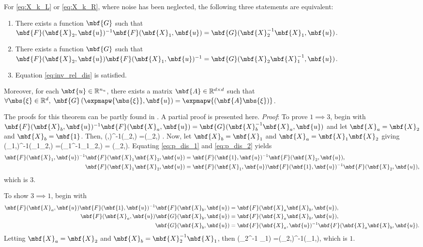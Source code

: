 \begin{theorem}
	\label{thm:inv}
	For \eqref{eq:X_k_L} or \eqref{eq:X_k_R}, where noise has been neglected, the following three statements are equivalent:
	\begin{enumerate}
		\item There exists a function $\mbf{G}$ such that $\mbf{F}(\mbf{X}_2,\mbf{u})^{-1}\mbf{F}(\mbf{X}_1,\mbf{u}) =\mbf{G}(\mbf{X}_2^{-1}\mbf{X}_1,\mbf{u})$.
		\item There exists a function $\mbf{G}$ such that $\mbf{F}(\mbf{X}_2,\mbf{u})\mbf{F}(\mbf{X}_1,\mbf{u})^{-1} =\mbf{G}(\mbf{X}_2\mbf{X}_1^{-1},\mbf{u})$.
		\item Equation \eqref{eq:inv_rel_dis} is satisfied.
	\end{enumerate}
	\sloppy Moreover, for each $\mbf{u} \in\mathbb{R}^{n_u}$, there exists a matrix $\mbf{A} \in \mathbb{R}^{d \times d}$  such that $\forall \mbs{\xi} \in \mathbb{R}^d, \;\mbf{G}\left(\expmapw{\mbs{\xi}},\mbf{u}\right) = \expmapw{\left(\mbf{A} \mbs{\xi}\right)}$.
\end{theorem}
The proofs for this theorem can be partly found in \cite{Chauchat2018,persComm2017}. A partial proof is presented here.
\textit{Proof}: To prove $1 \implies 3$, begin with  $\mbf{F}(\mbf{X}_b,\mbf{u})^{-1}\mbf{F}(\mbf{X}_a,\mbf{u}) =\mbf{G}(\mbf{X}_b^{-1}\mbf{X}_a,\mbf{u})$ and let $\mbf{X}_a = \mbf{X}_2$ and $\mbf{X}_b = \mbf{1}$. Then,
\beq
	(,)^{-1}(_2,) =(_2,) \label{eq:p_dis_1}.
\eeq
Now, let  $\mbf{X}_b = \mbf{X}_1$ and $\mbf{X}_a = \mbf{X}_1\mbf{X}_2$ giving
\beq
	(_1,)^{-1}(_1_2,) =(_1^{-1}_1_2,) = (_2,)\label{eq:p_dis_2}.
\eeq
Equating \eqref{eq:p_dis_1} and \eqref{eq:p_dis_2} yields
\begin{align}
	\mbf{F}(\mbf{X}_1,\mbf{u})^{-1}\mbf{F}(\mbf{X}_1\mbf{X}_2,\mbf{u}) & =\mbf{F}(\mbf{1},\mbf{u})^{-1}\mbf{F}(\mbf{X}_2,\mbf{u}), \notag \\
	\mbf{F}(\mbf{X}_1\mbf{X}_2,\mbf{u}) & =\mbf{F}(\mbf{X}_1,\mbf{u})\mbf{F}(\mbf{1},\mbf{u})^{-1}\mbf{F}(\mbf{X}_2,\mbf{u})\notag,
\end{align}
which is $3$.

To show $3 \implies 1$, begin with
\begin{align}
	\mbf{F}(\mbf{X}_a,\mbf{u})\mbf{F}(\mbf{1},\mbf{u})^{-1}\mbf{F}(\mbf{X}_b,\mbf{u}) & =\mbf{F}(\mbf{X}_a\mbf{X}_b,\mbf{u}), \notag \\
	\mbf{F}(\mbf{X}_a,\mbf{u})\mbf{G}(\mbf{X}_b,\mbf{u}) & =\mbf{F}(\mbf{X}_a\mbf{X}_b,\mbf{u}), \notag \\
	\mbf{G}(\mbf{X}_b,\mbf{u}) & =\mbf{F}(\mbf{X}_a,\mbf{u})^{-1}\mbf{F}(\mbf{X}_a\mbf{X}_b,\mbf{u}). \notag
\end{align}
Letting $\mbf{X}_a = \mbf{X}_2$ and $\mbf{X}_b = \mbf{X}_2^{-1} \mbf{X}_1$, then
\bdis
	\left(_2^{-1} _1\right) =(_2,)^{-1}(_1,),
\edis
which is $1$.

